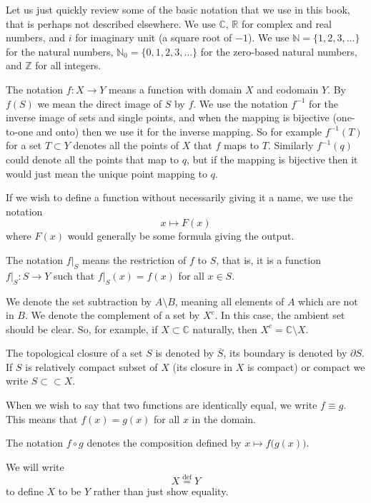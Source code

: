 \documentclass[12pt,openany]{book}
\newcommand{\C}{{\mathbb{C}}}
\newcommand{\R}{{\mathbb{R}}}
\newcommand{\Z}{{\mathbb{Z}}}
\newcommand{\N}{{\mathbb{N}}}
\theoremstyle{plain}
\theoremstyle{remark}
\theoremstyle{definition}
\theoremstyle{exercise}
\theoremstyle{example}
\begin{document}


Let us just quickly review some of the basic notation that we use in this
book, that is perhaps not described elsewhere.
We use $\C$, $\R$ for complex and real numbers, and $i$ for imaginary unit
(a square root of $-1$).  We use
$\N = \{ 1,2,3, \ldots \}$ for 
the natural numbers, 
$\N_0 = \{ 0,1,2,3, \ldots \}$ for the zero-based natural numbers,
and $\Z$ for all integers.

The notation $f \colon X \to Y$ means a function with domain $X$ and
codomain $Y$.  By $f(S)$ we mean the direct image of $S$ by $f$.
We use the notation $f^{-1}$ for the inverse image of sets and
single points, and when the mapping is bijective (one-to-one and onto)
then we use it for the inverse mapping.  So for example $f^{-1}(T)$ for
a set $T \subset Y$ denotes all the points of $X$ that $f$ maps to $T$.
Similarly $f^{-1}(q)$ could denote all the points that map to $q$,
but if the mapping is bijective then it would just mean the unique point
mapping to $q$.

If we wish to define a function without necessarily giving it a name, we use
the notation
\begin{equation*}
x \mapsto F(x)
\end{equation*}
where $F(x)$ would generally be some formula giving the output.

The notation $f|_S$ means the restriction of $f$ to $S$, that is,
it is a function
$f|_S \colon S \to Y$ such that $f|_S(x) = f(x)$ for all $x \in S$.

We denote the set subtraction by $A \setminus B$, meaning all elements of
$A$ which are not in $B$.
We denote the complement of a set by $X^c$.  In this case, the ambient set
should be clear.  So, for example, if $X \subset \C$ naturally,
then $X^c = \C \setminus X$.

The topological closure of a set $S$ is denoted by $\overline{S}$, its
boundary is denoted by $\partial S$.  If $S$ is relatively compact subset of $X$
(its closure in $X$ is compact) or compact we write $S \subset \subset X$.

When we wish to say that two functions are identically equal, we write
$f \equiv g$.  This means that $f(x) = g(x)$ for all $x$ in the domain.

The notation $f \circ g$ denotes the composition defined by $x \mapsto
f\bigl(g(x)\bigr)$.

We will write
$$
X
\overset{\text{def}}{=}
Y
$$
to define $X$ to be $Y$ rather than just show equality.
\end{document}
